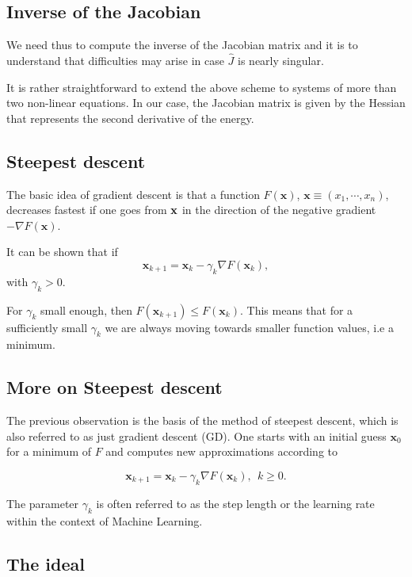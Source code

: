 \documentclass[%
oneside,                 %
final,                   %
10pt]{article}
\begin{document}
\subsection*{Inverse of the Jacobian}

We need thus to compute the inverse of the Jacobian matrix and it
is to understand that difficulties  may
arise in case $\hat{J}$ is nearly singular.

It is rather straightforward to extend the above scheme to systems of
more than two non-linear equations. In our case, the Jacobian matrix is given by the Hessian that represents the second derivative of the energy.

\subsection*{Steepest descent}

The basic idea of gradient descent is
that a function $F(\mathbf{x})$, 
$\mathbf{x} \equiv (x_1,\cdots,x_n)$, decreases fastest if one goes from $\bf {x}$ in the
direction of the negative gradient $-\nabla F(\mathbf{x})$.

It can be shown that if 
\[
\mathbf{x}_{k+1} = \mathbf{x}_k - \gamma_k \nabla F(\mathbf{x}_k),
\]
with $\gamma_k > 0$.

For $\gamma_k$ small enough, then $F(\mathbf{x}_{k+1}) \leq
F(\mathbf{x}_k)$. This means that for a sufficiently small $\gamma_k$
we are always moving towards smaller function values, i.e a minimum.

\subsection*{More on Steepest descent}

The previous observation is the basis of the method of steepest
descent, which is also referred to as just gradient descent (GD). One
starts with an initial guess $\mathbf{x}_0$ for a minimum of $F$ and
computes new approximations according to

\[
\mathbf{x}_{k+1} = \mathbf{x}_k - \gamma_k \nabla F(\mathbf{x}_k), \ \ k \geq 0.
\]

The parameter $\gamma_k$ is often referred to as the step length or
the learning rate within the context of Machine Learning.

\subsection*{The ideal}
\end{document}
